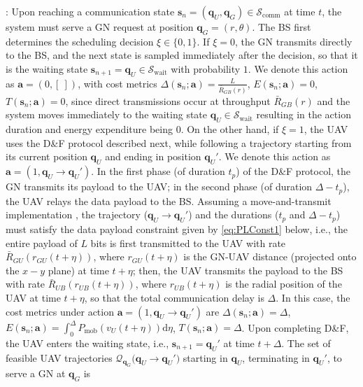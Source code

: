 \documentclass[12pt, draftcls, onecolumn]{IEEEtran}
\theoremstyle{plain}
\theoremstyle{definition}
\theoremstyle{remark}
\begin{document}
:
Upon reaching a communication state $\mathbf{s}_{n}{=}(\mathbf{q}_{U},\mathbf{q}_{G}){\in}\mathcal{S}_{\mathrm{comm}}$ at time $t$, the system must serve a GN request at position $\mathbf{q}_{G}{=}(r,\theta)$. The BS first determines the scheduling decision $\xi{\in}\{0,1\}$. If $\xi{=}0$, the GN transmits directly to the BS, and the next state is sampled immediately after the decision, so that it is the waiting state $\mathbf{s}_{n{+}1}{=}\mathbf{q}_{U}{\in}\mathcal{S}_{\mathrm{wait}}$ with probability $1$. We denote this action as $\mathbf{a}{=}(0,[\ ])$, with cost metrics $\Delta(\mathbf{s}_{n};\mathbf{a}){=}\frac{L}{\bar R_{GB}(r)}$, $E(\mathbf{s}_{n};\mathbf{a}){=}0$, $T(\mathbf{s}_{n};\mathbf{a}){=}0$, since direct transmissions occur at throughput $\bar{R}_{GB}(r)$ and the system moves immediately to the waiting state $\mathbf{q}_{U}{\in}\mathcal{S}_{\mathrm{wait}}$ resulting in the action duration and energy expenditure being $0$. On the other hand, if $\xi{=}1$, the UAV uses the D\&F protocol described next, while following a trajectory starting from its current position $\mathbf{q}_{U}$ and ending in position $\mathbf{q}_{U}'$. We denote this action as $\mathbf{a}{=}(1,\mathbf{q}_{U}{\rightarrow}{\mathbf{q}}_{U}')$. In the first phase (of duration $t_{p}$) of the D\&F protocol, the GN transmits its payload to the UAV; in the second phase (of duration $\Delta{-}t_{p}$), the UAV relays the data payload to the BS. Assuming a {move-and-transmit} implementation \cite{SCA}, the trajectory ($\mathbf{q}_{U}{\rightarrow}{\mathbf{q}}_{U}'$) and the durations ($t_{p}$ and $\Delta{-}t_{p}$) must satisfy
the data payload constraint given by \eqref{eq:PLConst1} below,
i.e., the entire payload of $L$ bits is first transmitted to the UAV with rate $\bar R_{GU}(r_{GU}(t{+}\eta))$, where $r_{GU}(t{+}{\eta})$ is the GN-UAV distance (projected onto the $x{-}y$ plane) at time $t{+}\eta$; then, the UAV transmits the payload to the BS with rate $\bar{R}_{UB}(r_{UB}(t{+}\eta))$, where $r_{UB}(t{+}\eta)$ is the radial position of the UAV at time $t{+}\eta$, so that the total communication delay is $\Delta$.  In this case, the cost metrics under action $\mathbf{{a}}=(1,\mathbf{q}_{U}{\rightarrow}{\mathbf{q}}_{U}')$ are $\Delta(\mathbf{s}_{n};\mathbf{{a}}){=}\Delta$, $E(\mathbf{s}_{n};\mathbf{{a}}){=}\int_0^\Delta P_{\mathrm{mob}}\left(v_{U}(t{+}\eta)\right)\mathrm{d}\eta$, $T(\mathbf{s}_{n};\mathbf{{a}}){=}\Delta$. Upon completing D\&F, the UAV enters the {waiting} state, i.e., $\mathbf{s}_{n{+}1}{=}\mathbf{q}_{U}'$ at time $t{+}\Delta$. The set of feasible UAV trajectories $\mathcal{Q}_{\mathbf q_G} \big({\mathbf q}_U\rightarrow{\mathbf q}_U'\big)$ starting in $\mathbf{q}_{U}$, terminating in $\mathbf{q}_{U}'$, to serve a GN at $\mathbf{q}_{G}$ is
\end{document}
